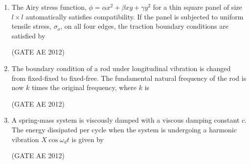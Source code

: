 \documentclass[journal,12pt,onecolumn]{IEEEtran}
\theoremstyle{remark}
\begin{document}
\begin{enumerate}
\item The Airy stress function, $\phi = \alpha x^2 + \beta xy + \gamma y^2$ for a thin square panel of size $l \times l$ automatically satisfies compatibility. If the panel is subjected to uniform tensile stress, $\sigma_o$, on all four edges, the traction boundary conditions are satisfied by
\begin{enumerate}
\end{enumerate}
\hfill(GATE AE 2012)



\item The boundary condition of a rod under longitudinal vibration is changed from fixed-fixed to fixed-free. The fundamental natural frequency of the rod is now $k$ times the original frequency, where $k$ is
\begin{enumerate}
\end{enumerate}
\hfill(GATE AE 2012)



\item A spring-mass system is viscously damped with a viscous damping constant $c$. The energy dissipated per cycle when the system is undergoing a harmonic vibration $X \cos\omega_d t$ is given by
\begin{enumerate}
\end{enumerate}
\hfill(GATE AE 2012)




\end{enumerate}
\end{document}
